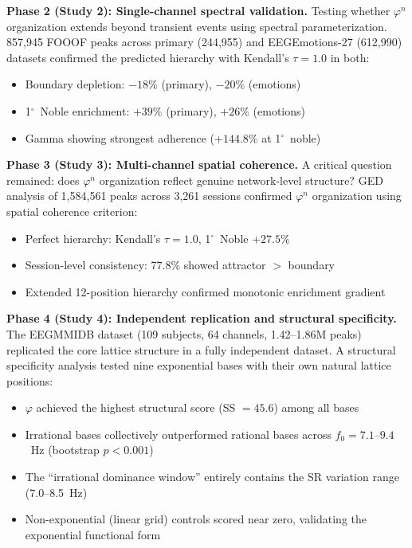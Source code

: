 \documentclass[11pt,a4paper]{article}
\newcommand{\degree}{$^\circ$}  %
\newcommand{\phisym}{\varphi}
\begin{document}
\textbf{Phase 2 (Study 2): Single-channel spectral validation.} Testing whether $\phisym^n$ organization extends beyond transient events using spectral parameterization. 857,945 FOOOF peaks across primary (244,955) and EEGEmotions-27 (612,990) datasets confirmed the predicted hierarchy with Kendall's $\tau = 1.0$ in both:
\begin{itemize}
    \item Boundary depletion: $-18\%$ (primary), $-20\%$ (emotions)
    \item 1\degree\ Noble enrichment: $+39\%$ (primary), $+26\%$ (emotions)
    \item Gamma showing strongest adherence ($+144.8\%$ at 1\degree\ noble)
\end{itemize}

\textbf{Phase 3 (Study 3): Multi-channel spatial coherence.} A critical question remained: does $\phisym^n$ organization reflect genuine network-level structure? GED analysis of 1,584,561 peaks across 3,261 sessions confirmed $\phisym^n$ organization using spatial coherence criterion:
\begin{itemize}
    \item Perfect hierarchy: Kendall's $\tau = 1.0$, 1\degree\ Noble $+27.5\%$
    \item Session-level consistency: 77.8\% showed attractor $>$ boundary
    \item Extended 12-position hierarchy confirmed monotonic enrichment gradient
\end{itemize}

\textbf{Phase 4 (Study 4): Independent replication and structural specificity.} The EEGMMIDB dataset (109 subjects, 64 channels, 1.42--1.86M peaks) replicated the core lattice structure in a fully independent dataset. A structural specificity analysis tested nine exponential bases with their own natural lattice positions:
\begin{itemize}
    \item $\phisym$ achieved the highest structural score (SS $= 45.6$) among all bases
    \item Irrational bases collectively outperformed rational bases across $f_0 = 7.1$--$9.4$~Hz (bootstrap $p < 0.001$)
    \item The ``irrational dominance window'' entirely contains the SR variation range (7.0--8.5~Hz)
    \item Non-exponential (linear grid) controls scored near zero, validating the exponential functional form
\end{itemize}
\end{document}
